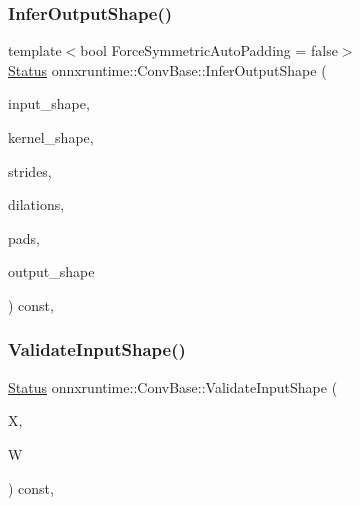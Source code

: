 \subsubsection{\texorpdfstring{Infer\+Output\+Shape()}{InferOutputShape()}}
{\footnotesize\ttfamily template$<$bool Force\+Symmetric\+Auto\+Padding = false$>$ \\
\mbox{\hyperlink{classonnxruntime_1_1common_1_1Status}{Status}} onnxruntime\+::\+Conv\+Base\+::\+Infer\+Output\+Shape (\begin{DoxyParamCaption}\item[{const \mbox{\hyperlink{classonnxruntime_1_1TensorShape}{Tensor\+Shape}} \&}]{input\+\_\+shape,  }\item[{const std\+::vector$<$ int64\+\_\+t $>$ \&}]{kernel\+\_\+shape,  }\item[{const std\+::vector$<$ int64\+\_\+t $>$ \&}]{strides,  }\item[{const std\+::vector$<$ int64\+\_\+t $>$ \&}]{dilations,  }\item[{std\+::vector$<$ int64\+\_\+t $>$ $\ast$}]{pads,  }\item[{std\+::vector$<$ int64\+\_\+t $>$ $\ast$}]{output\+\_\+shape }\end{DoxyParamCaption}) const\hspace{0.3cm}{\ttfamily [inline]}, {\ttfamily [protected]}}

\mbox{\label{classonnxruntime_1_1ConvBase_ab65984bcf5c5ce841711fa2cfc440889}} 
\subsubsection{\texorpdfstring{Validate\+Input\+Shape()}{ValidateInputShape()}}
{\footnotesize\ttfamily \mbox{\hyperlink{classonnxruntime_1_1common_1_1Status}{Status}} onnxruntime\+::\+Conv\+Base\+::\+Validate\+Input\+Shape (\begin{DoxyParamCaption}\item[{const \mbox{\hyperlink{classonnxruntime_1_1Tensor}{Tensor}} $\ast$}]{X,  }\item[{const \mbox{\hyperlink{classonnxruntime_1_1Tensor}{Tensor}} $\ast$}]{W }\end{DoxyParamCaption}) const\hspace{0.3cm}{\ttfamily [inline]}, {\ttfamily [protected]}}



